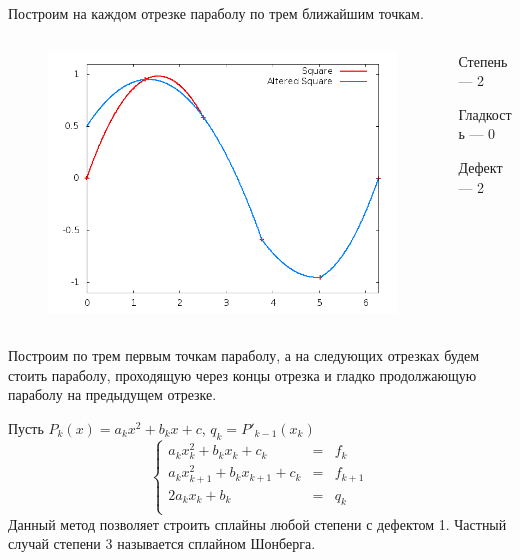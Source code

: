 \documentclass[professionalfonts,compress,unicode]{beamer}
\begin{document}
{
	Построим на каждом отрезке параболу по трем ближайшим точкам.
	\begin{columns}[c]
	\begin{column}{0.6\textwidth}
	\begin{figure}
	\center
	\includegraphics[width=\textwidth]{spline2_2.png}%
	\end{figure}
	\end{column}
	\begin{column}{0.4\textwidth}
	Степень --- 2
	
	Гладкость --- 0 
	
	Дефект --- 2
	\end{column}
	\end{columns}
}

{
	Построим по трем первым точкам параболу, а на следующих отрезках будем стоить параболу, проходящую
	через концы отрезка и гладко продолжающую параболу на предыдущем отрезке.
	
	Пусть $P_k(x) = a_kx^2+b_kx+c$, $q_k = P'_{k-1}(x_k)$
	$$
	\left\{
	\begin{array}{lcl}
		a_kx_k^2+b_kx_k+c_k &=& f_k\\
		a_kx_{k+1}^2+b_kx_{k+1}+c_k &=& f_{k+1}\\
		2a_kx_k+b_k &=& q_k\\
	\end{array}
	\right.
	$$
	Данный метод позволяет строить сплайны любой степени с дефектом 1. Частный случай степени 3 называется сплайном Шонберга.
}
\end{document}
